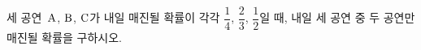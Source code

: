 세 공연~$\mathrm{A}$, $\mathrm{B}$, $\mathrm{C}$가 내일 매진될 확률이 각각 $\dfrac{1}{4}$, $\dfrac{2}{3}$, $\dfrac{1}{2}$일 때, 내일 세 공연 중 두 공연만 매진될 확률을 구하시오. 
